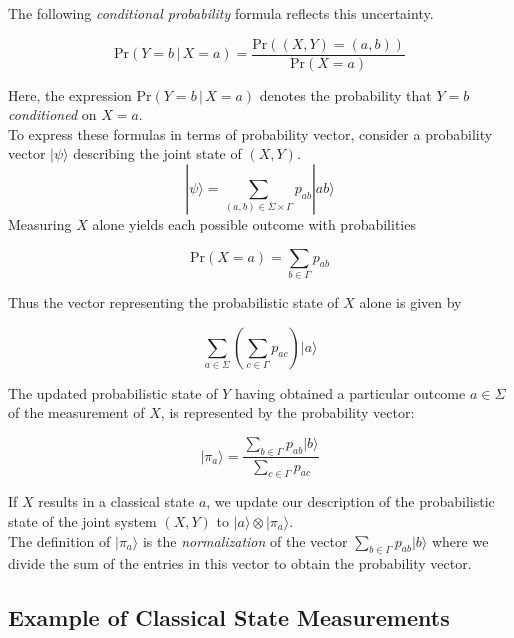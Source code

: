 \documentclass[svgnames]{article}     %
\begin{document}
The following \textit{conditional probability} formula reflects this
uncertainty. 

\[
\text{Pr} (Y = b \, | \, X = a) = \frac{\text{Pr} ((X,Y) = (a, b))}{\text{Pr} (X=a)}
\] \vspace{5px}

Here, the expression $\text{Pr} (Y=b \, | \, X = a )$ denotes the probability
that $Y = b$ \textit{conditioned} on $X = a$. \\

To express these formulas in terms of probability vector, consider
a probability vector $|\psi\rangle $ describing the joint state of $(X,Y)$. \\

\[
  |\psi\rangle = \sum_{(a,b) \in \Sigma \times \Gamma} p_{ab} |ab\rangle 
\] \vspace{5px}
Measuring $X$ alone yields each possible outcome with probabilities 

\[
  \text{Pr} (X=a) = \sum_{b\in\Gamma} p_{ab}
\] \vspace{5px}

Thus the vector representing the probabilistic state of $X$ alone is given by 

\[
  \sum_{a\in\Sigma} \left( \sum_{c\in\Gamma} p_{ac} \right) |a\rangle 
\] \vspace{5px}



The updated probabilistic state of $Y$ having obtained a particular outcome
$a\in\Sigma$ of the measurement of $X$, is represented by the probability
vector: 

\[
  |\pi_a\rangle = \frac{\sum_{b\in\Gamma} p_{ab}|b\rangle }{\sum_{c\in\Gamma}
  p_{ac}}
\] \vspace{5px}

If $X$ results in a classical state $a$, we update our description of the
probabilistic state of the joint system $(X,Y)$ to $|a\rangle \otimes
|\pi_a\rangle$. \\

The definition of $|\pi_a\rangle $ is the \textit{normalization} of the vector
$\sum_{b\in\Gamma} p_{ab}|b\rangle $ where we divide the sum of the entries in
this vector to obtain the probability vector. \\

\subsection{Example of Classical State Measurements}
\end{document}
